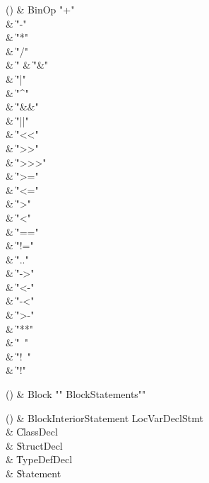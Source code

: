 \begin{bbgrammarappendix}

() & BinOp \label{prod:BinOp}  \: \xcd"+"  \\

 &    \| \xcd"-" \\
 &    \| \xcd"*" \\
 &    \| \xcd"/" \\
 &    \| \xcd"%
 &    \| \xcd"&" \\
 &    \| \xcd"|" \\
 &    \| \xcd"^" \\
 &    \| \xcd"&&" \\
 &    \| \xcd"||" \\
 &    \| \xcd"<<" \\
 &    \| \xcd">>" \\
 &    \| \xcd">>>" \\
 &    \| \xcd">=" \\
 &    \| \xcd"<=" \\
 &    \| \xcd">" \\
 &    \| \xcd"<" \\
 &    \| \xcd"==" \\
 &    \| \xcd"!=" \\
 &    \| \xcd".." \\
 &    \| \xcd"->" \\
 &    \| \xcd"<-" \\
 &    \| \xcd"-<" \\
 &    \| \xcd">-" \\
 &    \| \xcd"**" \\
 &    \| \xcd"~" \\
 &    \| \xcd"!~" \\
 &    \| \xcd"!" \\

\end{bbgrammarappendix}

\begin{bbgrammarappendix}

() & Block \label{prod:Block}  \: \xcd"{" BlockStatements\opt \xcd"}"  \\


\end{bbgrammarappendix}

\begin{bbgrammarappendix}

() & BlockInteriorStatement \label{prod:BlockInteriorStatement}  \: LocVarDeclStmt  \\

 &    \| ClassDecl \\
 &    \| StructDecl \\
 &    \| TypeDefDecl \\
 &    \| Statement \\

\end{bbgrammarappendix}

